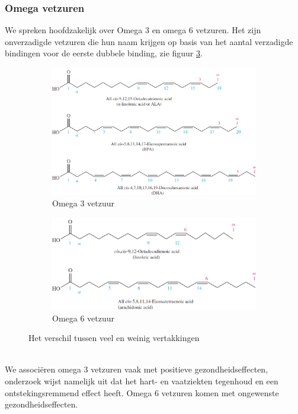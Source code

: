 \documentclass[a4paper,kul]{kulakarticle} %
\begin{document}
\subsubsection{Omega vetzuren}
We spreken hoofdzakelijk over Omega 3 en omega 6 vetzuren. Het zijn onverzadigde vetzuren die hun naam krijgen op basis van het aantal verzadigde bindingen voor de eerste dubbele binding, zie figuur \ref{fig:omegaVZ}. 
\begin{figure}[h]
	\centering
	\begin{subfigure}{.5\textwidth}
		\centering
		\includegraphics[width=1\linewidth]{Omega3VZ}
		\caption{Omega 3 vetzuur}
		\label{fig:Omega3}
	\end{subfigure}%
	\begin{subfigure}{.5\textwidth}
		\centering
		\includegraphics[width=1\linewidth]{Omega6VZ}
		\caption{Omega 6 vetzuur}
		\label{fig:Omega6}
	\end{subfigure}
	\caption{Het verschil tussen veel en weinig vertakkingen}
	\label{fig:omegaVZ}
\end{figure}\\
We associëren omega 3 vetzuren vaak met positieve gezondheidseffecten, onderzoek wijst namelijk uit dat het hart- en vaatziekten tegenhoud en een ontstekingsremmend effect heeft. Omega 6 vetzuren komen met ongewenste gezondheidseffecten.
\end{document}
